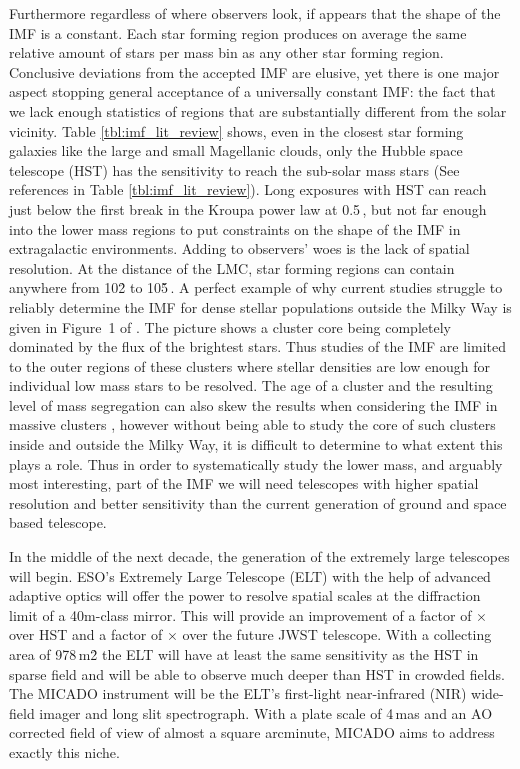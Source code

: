 Furthermore regardless of where observers look, if appears that the shape of the IMF is a constant. Each star forming region produces on average the same relative amount of stars per mass bin as any other star forming region. Conclusive deviations from the accepted IMF are elusive, yet there is one major aspect stopping general acceptance of a universally constant IMF: the fact that we lack enough statistics of regions that are substantially different from the solar vicinity. Table \ref{tbl:imf_lit_review} shows, even in the closest star forming galaxies like the large and small Magellanic clouds, only the Hubble space telescope (HST) has the sensitivity to reach the sub-solar mass stars (See references in Table \ref{tbl:imf_lit_review}). Long exposures with HST can reach just below the first break in the Kroupa power law at 0.5\,\msun \citep{dario2009,kalirai2013,geha2013}, but not far enough into the lower mass regions to put constraints on the shape of the IMF in extragalactic environments. Adding to observers' woes is the lack of spatial resolution. At the distance of the LMC, star forming regions can contain anywhere from 10\h2 to 10\h5\,\spa. A perfect example of why current studies struggle to reliably determine the IMF for dense stellar populations outside the Milky Way is given in Figure~1 of \citet{sirianni2000}. The picture shows a cluster core being completely dominated by the flux of the brightest stars. Thus studies of the IMF are limited to the outer regions of these clusters where stellar densities are low enough for individual low mass stars to be resolved. The age of a cluster and the resulting level of mass segregation can also skew the results when considering the IMF in massive clusters \citep{lim2013}, however without being able to study the core of such clusters inside and outside the Milky Way, it is difficult to determine to what extent this plays a role. Thus in order to systematically study the lower mass, and arguably most interesting, part of the IMF we will need telescopes with higher spatial resolution and better sensitivity than the current generation of ground and space based telescope.

In the middle of the next decade, the generation of the extremely large telescopes will begin. ESO's Extremely Large Telescope (ELT) \citep{eelt} with the help of advanced adaptive optics \citep{maory} will offer the power to resolve spatial scales at the diffraction limit of a 40m-class mirror. This will provide an improvement of a factor of $\times$ over HST and a factor of $\times$ over the future JWST telescope. With a collecting area of 978\,m\h2 the ELT will have at least the same sensitivity as the HST in sparse field and will be able to observe much deeper than HST in crowded fields. The MICADO instrument \citep{micado, micado2016} will be the ELT's first-light near-infrared (NIR) wide-field imager and long slit spectrograph. With a plate scale of 4\,mas and an AO corrected field of view of almost a square arcminute, MICADO aims to address exactly this niche. 


